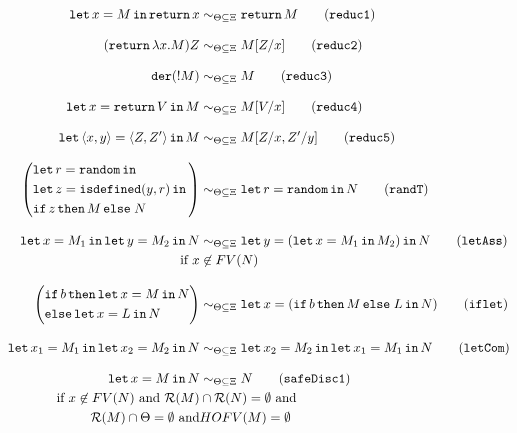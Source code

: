 \begin{figure}[htpb]
    \centering
    \footnotesize
    \begin{align}
    \letin{x=M}{\return x} &\sim_{\Theta\subseteq\Xi}\return M\label{reduc1}\tag{$\mathtt{reduc1}$} \\[2ex]
    (\return \lambda x.M)Z &\sim_{\Theta\subseteq\Xi}M[Z/x]\label{reduc2}\tag{$\mathtt{reduc2}$} \\[2ex]
    \mathtt{der}(\bang M)&\sim_{\Theta\subseteq\Xi}M\label{reduc3}\tag{$\mathtt{reduc3}$} \\[2ex]
    \letin{x=\return V}{M}&\sim_{\Theta\subseteq\Xi}M[V/x] \label{reduc4}\tag{$\mathtt{reduc4}$} \\[2ex]
    \letin{\lis{x,y}=\lis{Z,Z'}}{M}&\sim_{\Theta\subseteq\Xi}M[Z/x,Z'/y]\label{reduc5}\tag{$\mathtt{reduc5}$} \\[2ex]
    \left(
    \begin{aligned}
        &\letin{r=\random}{} \\
        &\letin{z=\mathtt{isdefined}(y,r)}{} \\
        &\ifthen{z}{M}{N}
    \end{aligned}\right) &\sim_{\Theta\subseteq\Xi} \letin{r=\random}{N}\label{randT}\tag{$\mathtt{randT}$}
    \\[2ex]
    \letin{x=M_1}{\letin{y=M_2}{N}}{} &\sim_{\Theta\subseteq\Xi} \letin{y=(\letin{x=M_1}{M_2)}}{N} \label{letAss}\tag{$\mathtt{letAss}$} \\
    \text{if}\ x &\not\in FV(N) \nonumber
    \\[2ex]
    \left(\begin{aligned}
    &\mathtt{if}\,{b}\,\mathtt{then}\,\letin{x=M}{N} \\
    &\mathtt{else}\,\letin{x=L}{N}
    \end{aligned}\right) &\sim_{\Theta\subseteq\Xi} \letin{x=(\ifthen{b}{M}{L}}{N)} \tag{$\mathtt{iflet}$}\label{iflet}
    \\[2ex]
    \letin{x_1=M_1}{\letin{x_2=M_2}{N}} &\sim_{\Theta\subseteq\Xi} \letin{x_2=M_2}{\letin{x_1=M_1}{N}}\tag{$\mathtt{letCom}$}\label{letCom}
    \\[2ex]
    \letin{x=M}{N}&\sim_{\Theta\subseteq\Xi}N \tag{$\mathtt{safeDisc1}$}\label{safeDisc1} \\
    \text{if}\ x \not\in FV(N) \ \text{and}\ \mathcal{R}(M) &\cap \mathcal{R}(N) = \emptyset \ \text{and}\ \nonumber \\ \mathcal{R}(M) \cap \Theta = \emptyset \ \text{and} &HOFV(M) = \emptyset \nonumber
    \\[2ex]

\end{align}
\end{figure}
